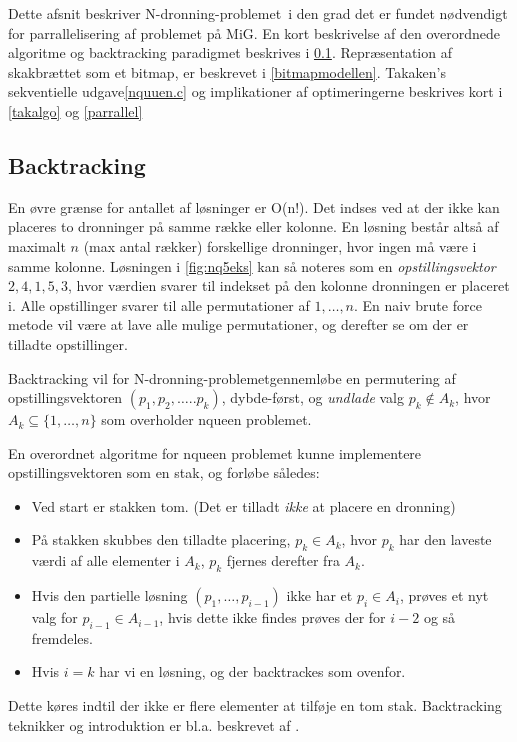 \documentclass[pdf,draft,a4paper,11pt]{article}
\newcommand{\mig}{MiG}
\newcommand{\nq}{N-dronning-problemet}
\begin{document}
Dette afsnit beskriver \nq\ i den grad det er fundet nødvendigt for parrallelisering af problemet på \mig. En kort beskrivelse af den overordnede algoritme og backtracking paradigmet beskrives i \ref{backtracking}. Repræsentation af skakbrættet som et bitmap, er beskrevet i \ref{bitmapmodellen}. Takaken's sekventielle udgave\ref{nquuen.c} og implikationer af optimeringerne beskrives kort i \ref{takalgo} og \ref{parrallel}


\subsection{Backtracking}\label{backtracking}

En øvre grænse for antallet af løsninger er O(n!). Det indses ved at der ikke kan placeres to dronninger på samme række eller kolonne. En løsning består altså af maximalt $n$ (max antal rækker) forskellige dronninger, hvor ingen må være i samme kolonne. Løsningen i \ref{fig:nq5eks} kan så noteres som en \emph{opstillingsvektor} $2,4,1,5,3$, hvor værdien svarer til indekset på den kolonne dronningen er placeret i. Alle opstillinger svarer til alle  permutationer af ${1,\ldots,n}$. En naiv brute force metode vil være at lave alle mulige permutationer, og derefter se om der er tilladte opstillinger.

Backtracking vil for \nq gennemløbe en permutering af opstillingsvektoren  $(p_1,p_2,\ldots..p_k)$, dybde-først, og \emph{undlade} valg $p_k \notin A_k$, hvor $A_k\subseteq \{1,\ldots,n\}$  som overholder nqueen problemet. 

En overordnet algoritme for nqueen problemet kunne implementere opstillingsvektoren som en stak, og forløbe således:
\begin{itemize}
\item Ved start er stakken tom. (Det er tilladt \emph{ikke} at placere en dronning)
\item På stakken skubbes den tilladte placering, $p_k \in A_k$, hvor $p_k$ har den laveste værdi af alle elementer i $A_k$, $p_k$ fjernes derefter fra $A_k$.
\item Hvis den partielle løsning $(p_1,\ldots,p_{i-1})$ ikke har et $p_i \in A_i$, prøves et nyt valg for $p_{i-1} \in A_{i-1}$, hvis dette ikke findes prøves der for $i-2$ og så fremdeles. 
\item Hvis $i=k$ har vi en løsning,  og der backtrackes som ovenfor.
\end{itemize}
Dette køres indtil der ikke er flere elementer at tilføje en tom stak.
Backtracking teknikker og introduktion er bl.a. beskrevet af \cite{Golomb72}.
\end{document}
